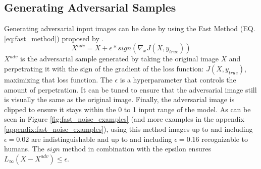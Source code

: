\subsection{Generating Adversarial Samples}
Generating adversarial input images can be done by using the Fast Method (EQ. \ref{eq:fast_method}) proposed by \citeauthor{goodfellow2015explaining}.
\begin{equation}
    X^{adv} = X + \epsilon * sign(\nabla_{x}J(X, y_{true}))
    \label{eq:fast_method}
\end{equation}
$X^{adv}$ is the adversarial sample generated by taking the original image $X$ and perpetrating it with the sign of the gradient of the loss function: $J(X, y_{true})$, maximizing that loss function. The $\epsilon$ is a hyperparameter that controls the amount of perpetration. It can be tuned to ensure that the adversarial image still is visually the same as the original image. Finally, the adversarial image is clipped to ensure it stays within the 0 to 1 input range of the model. As can be seen in Figure \ref{fig:fast_noise_examples} (and more examples in the appendix \ref{appendix:fast_noise_examples}), using this method images up to and including $\epsilon=0.02$ are indistinguishable and up to and including $\epsilon=0.16$ recognizable to humans. The $sign$ method in combination with the epsilon ensures $L_{\infty}(X - X^{adv}) \leq \epsilon$.

